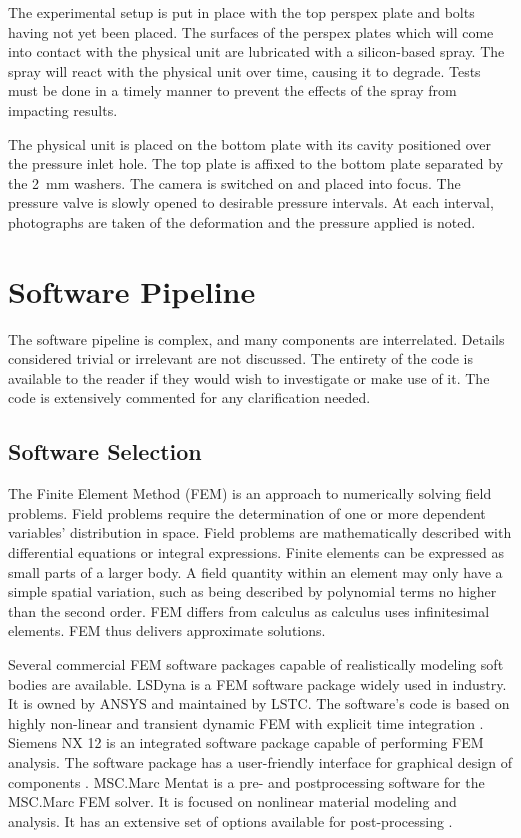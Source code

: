 The experimental setup is put in place with the top perspex plate and bolts having not yet been placed. The surfaces of the perspex plates which will come into contact with the physical unit are lubricated with a silicon-based spray. The spray will react with the physical unit over time, causing it to degrade. Tests must be done in a timely manner to prevent the effects of the spray from impacting results.

The physical unit is placed on the bottom plate with its cavity positioned over the pressure inlet hole. The top plate is affixed to the bottom plate separated by the \SI{2}{mm} washers. The camera is switched on and placed into focus. The pressure valve is slowly opened to desirable pressure intervals. At each interval, photographs are taken of the deformation and the pressure applied is noted.

\section{Software Pipeline}
\label{sec:SW}

The software pipeline is complex, and many components are interrelated. Details considered trivial or irrelevant are not discussed. The entirety of the code is available to the reader if they would wish to investigate or make use of it. The code is extensively commented for any clarification needed.

\subsection{Software Selection}

The Finite Element Method (FEM) is an approach to numerically solving field problems. Field problems require the determination of one or more dependent variables' distribution in space. Field problems are mathematically described with differential equations or integral expressions. Finite elements can be expressed as small parts of a larger body. A field quantity within an element may only have a simple spatial variation, such as being described by polynomial terms no higher than the second order. FEM differs from calculus as calculus uses infinitesimal elements. FEM thus delivers approximate solutions. \citep{Cook2002}

Several commercial FEM software packages capable of realistically modeling soft bodies are available. LSDyna is a FEM software package widely used in industry. It is owned by ANSYS and maintained by LSTC. The software's code is based on highly non-linear and transient dynamic FEM with explicit time integration \citep{LSDyna}. Siemens NX 12 is an integrated software package capable of performing FEM analysis. The software package has a user-friendly interface for graphical design of components \citep{NX12}. MSC.Marc Mentat is a pre- and postprocessing software for the MSC.Marc FEM solver. It is focused on nonlinear material modeling and analysis. It has an extensive set of options available for post-processing \citep{MSC}.

